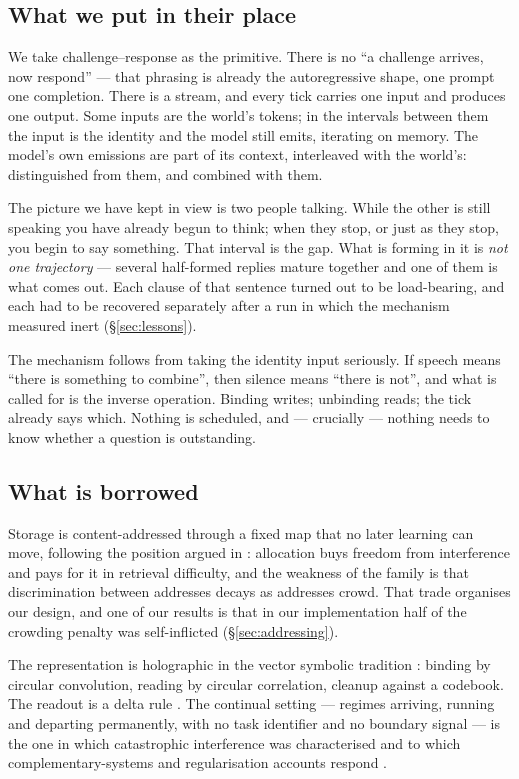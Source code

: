 \documentclass[11pt,a4paper]{article}
\theoremstyle{plain}
\theoremstyle{definition}
\theoremstyle{remark}
\begin{document}
\subsection{What we put in their place}

We take challenge--response as the primitive. There is no ``a challenge arrives,
now respond'' --- that phrasing is already the autoregressive shape, one prompt
one completion. There is a stream, and every tick carries one input and produces
one output. Some inputs are the world's tokens; in the intervals between them the
input is the identity and the model still emits, iterating on memory. The
model's own emissions are part of its context, interleaved with the world's:
distinguished from them, and combined with them.

The picture we have kept in view is two people talking. While the other is still
speaking you have already begun to think; when they stop, or just as they stop,
you begin to say something. That interval is the gap. What is forming in it is
\emph{not one trajectory} --- several half-formed replies mature together and one
of them is what comes out. Each clause of that sentence turned out to be
load-bearing, and each had to be recovered separately after a run in which the
mechanism measured inert (\S\ref{sec:lessons}).

The mechanism follows from taking the identity input seriously. If speech means
``there is something to combine'', then silence means ``there is not'', and what
is called for is the inverse operation. Binding writes; unbinding reads; the tick
already says which. Nothing is scheduled, and --- crucially --- nothing needs to
know whether a question is outstanding.

\subsection{What is borrowed}

Storage is content-addressed through a fixed map that no later learning can
move, following the position argued in \citet{yang_2026_22161096}: allocation
buys freedom from interference and pays for it in retrieval difficulty, and the
weakness of the family is that discrimination between addresses decays as
addresses crowd. That trade organises our design, and one of our results is that
in our implementation half of the crowding penalty was self-inflicted
(\S\ref{sec:addressing}).

The representation is holographic \citep{plate1995holographic} in the vector
symbolic tradition \citep{smolensky1990tensor,kanerva1988sparse,%
kanerva2009hyperdimensional,gayler2003vector,eliasmith2013build,%
kleyko2023survey}: binding by circular convolution, reading by circular
correlation, cleanup against a codebook. The readout is a delta rule
\citep{widrow1960adaptive,rosenblatt1958perceptron}. The continual setting ---
regimes arriving, running and departing permanently, with no task identifier
and no boundary signal --- is the one in which catastrophic interference was
characterised \citep{mccloskey1989catastrophic,french1999catastrophic} and to
which complementary-systems and regularisation accounts respond
\citep{mcclelland1995complementary,kirkpatrick2017overcoming,%
parisi2019continual}.
\end{document}
